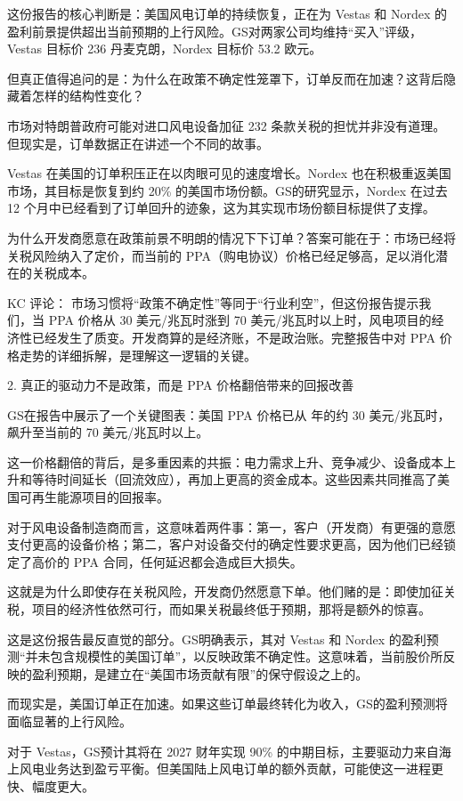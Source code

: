 \documentclass[11pt]{ctexart}
\begin{document}
这份报告的核心判断是：美国风电订单的持续恢复，正在为 Vestas 和 Nordex 的盈利前景提供超出当前预期的上行风险。GS对两家公司均维持“买入”评级，Vestas 目标价 236 丹麦克朗，Nordex 目标价 53.2 欧元。

但真正值得追问的是：为什么在政策不确定性笼罩下，订单反而在加速？这背后隐藏着怎样的结构性变化？

市场对特朗普政府可能对进口风电设备加征 232 条款关税的担忧并非没有道理。但现实是，订单数据正在讲述一个不同的故事。

Vestas 在美国的订单积压正在以肉眼可见的速度增长。Nordex 也在积极重返美国市场，其目标是恢复到约 20\% 的美国市场份额。GS的研究显示，Nordex 在过去 12 个月中已经看到了订单回升的迹象，这为其实现市场份额目标提供了支撑。

为什么开发商愿意在政策前景不明朗的情况下下订单？答案可能在于：市场已经将关税风险纳入了定价，而当前的 PPA（购电协议）价格已经足够高，足以消化潜在的关税成本。

KC 评论： 市场习惯将“政策不确定性”等同于“行业利空”，但这份报告提示我们，当 PPA 价格从 30 美元/兆瓦时涨到 70 美元/兆瓦时以上时，风电项目的经济性已经发生了质变。开发商算的是经济账，不是政治账。完整报告中对 PPA 价格走势的详细拆解，是理解这一逻辑的关键。

2. 真正的驱动力不是政策，而是 PPA 价格翻倍带来的回报改善

GS在报告中展示了一个关键图表：美国 PPA 价格已从 年的约 30 美元/兆瓦时，飙升至当前的 70 美元/兆瓦时以上。

这一价格翻倍的背后，是多重因素的共振：电力需求上升、竞争减少、设备成本上升和等待时间延长（回流效应），再加上更高的资金成本。这些因素共同推高了美国可再生能源项目的回报率。

对于风电设备制造商而言，这意味着两件事：第一，客户（开发商）有更强的意愿支付更高的设备价格；第二，客户对设备交付的确定性要求更高，因为他们已经锁定了高价的 PPA 合同，任何延迟都会造成巨大损失。

这就是为什么即使存在关税风险，开发商仍然愿意下单。他们赌的是：即使加征关税，项目的经济性依然可行，而如果关税最终低于预期，那将是额外的惊喜。

这是这份报告最反直觉的部分。GS明确表示，其对 Vestas 和 Nordex 的盈利预测“并未包含规模性的美国订单”，以反映政策不确定性。这意味着，当前股价所反映的盈利预期，是建立在“美国市场贡献有限”的保守假设之上的。

而现实是，美国订单正在加速。如果这些订单最终转化为收入，GS的盈利预测将面临显著的上行风险。

对于 Vestas，GS预计其将在 2027 财年实现 90\% 的中期目标，主要驱动力来自海上风电业务达到盈亏平衡。但美国陆上风电订单的额外贡献，可能使这一进程更快、幅度更大。
\end{document}
